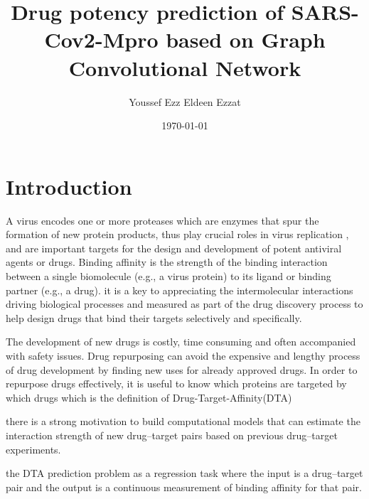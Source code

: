 \documentclass[11pt, a4paper]{article}
\title{Drug potency prediction of SARS-Cov2-Mpro based on Graph Convolutional Network}
\author{Youssef Ezz Eldeen Ezzat}
\date{\today}
\begin{document}


\tableofcontents

\section{Introduction}


    A virus encodes one or more proteases which are enzymes that spur the formation of new protein products, thus play crucial roles in virus replication ,
    and are important targets for the design and development of potent antiviral agents or drugs.
    Binding affinity is the strength of the binding interaction between a single biomolecule (e.g., a virus protein) to its ligand or binding partner (e.g., a drug).
    it is a key to appreciating the intermolecular interactions driving biological processes and measured as part of the drug discovery process to help design drugs that bind their targets selectively and specifically.

    The development of new drugs is costly, time consuming and often accompanied with safety issues.
    Drug repurposing can avoid the expensive and lengthy process of drug development by finding new uses for already approved drugs. In order to repurpose drugs effectively, it is useful to know which proteins are targeted by
    which drugs which is the definition of Drug-Target-Affinity(DTA)\cite{1}

    there is a strong motivation to build computational models that can estimate the interaction strength of new drug–target pairs based on previous drug–target
    experiments.

    the DTA prediction problem as a regression task where the input is a drug–target pair and the output is a continuous measurement of binding affinity
    for that pair.
\end{document}
